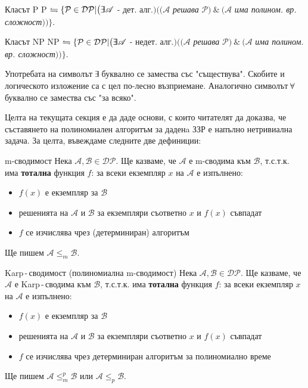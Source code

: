 \begin{boxalternativedefinition*}{Класът P}{}
	P $\leftrightharpoons\{\mathcal{P}\in\mathcal{DP}|\big(\doubleexists\mathscr{A}$ - дет. алг.$\big)\big((\mathscr{A}$ \emph{решава} $\mathcal{P})\ \&\ (\mathscr{A}$ \emph{има полином. вр. сложност}$)\big)\}$.
\end{boxalternativedefinition*}
\begin{boxalternativedefinition*}{Класът NP}{}
	NP $\leftrightharpoons\{\mathcal{P}\in\mathcal{DP}|\big(\doubleexists\mathscr{A}$ - недет. алг.$\big)\big((\mathscr{A}$ \emph{решава} $\mathcal{P})\ \&\ (\mathscr{A}$ \emph{има полином. вр. сложност}$)\big)\}$.
\end{boxalternativedefinition*}
\begin{remark*}
	Употребата на символът $\,\doubleexists\,$ буквално се замества със "съществува". Скобите и логическото изложение са с цел по-лесно възприемане. Аналогично символът $\,\doubleforall\,$ буквално се замества със "за всяко".
\end{remark*}
\noindent
Целта на текущата секция е да даде основи, с които читателят да доказва, че съставянето на полиномиален алгоритъм за даденa ЗЗР е напълно нетривиална задача. За целта, въвеждаме следните две дефиниции:
\begin{boxdefinition}{m-сводимост}{}
	Нека $\mathcal{A},\mathcal{B}\in\mathcal{DP}$. Ще казваме, че $\mathcal{A}$ е m-сводима към $\mathcal{B}$, т.с.т.к. има \textbf{тотална} функция $f$: за всеки екземпляр $x$ на $\mathcal{A}$ е изпълнено:
	\begin{itemize}
		\item $f(x)$ е екземпляр за $\mathcal{B}$
		\item решенията на $\mathcal{A}$ и $\mathcal{B}$ за екземпляри съответно $x$ и $f(x)$ съвпадат
		\item $f$ се изчислява чрез (детерминиран) алгоритъм
	\end{itemize}
	Ще пишем $\mathcal{A}\le_m\mathcal{B}$.
\end{boxdefinition}
\begin{boxdefinition}{Karp\,-\,сводимост (полиномиална m-сводимост)}{}
	Нека $\mathcal{A},\mathcal{B}\in\mathcal{DP}$. Ще казваме, че $\mathcal{A}$ е Karp\,-\,сводима към $\mathcal{B}$, т.с.т.к. има \textbf{тотална} функция $f$: за всеки екземпляр $x$ на $\mathcal{A}$ е изпълнено:
	\begin{itemize}
		\item $f(x)$ е екземпляр за $\mathcal{B}$
		\item решенията на $\mathcal{A}$ и $\mathcal{B}$ за екземпляри съответно $x$ и $f(x)$ съвпадат
		\item $f$ се изчислява чрез детерминиран алгоритъм за полиномиално време
	\end{itemize}
	Ще пишем $\mathcal{A}\le_m^p\mathcal{B}$ или $\mathcal{A}\le_p\mathcal{B}$.
\end{boxdefinition}
